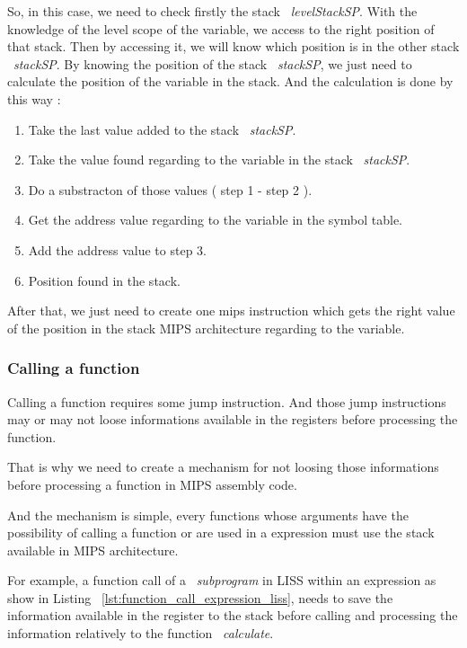 \documentclass[
  oneside,
  11pt, a4paper,
  footinclude=true,
  headinclude=true,
  cleardoublepage=empty
]{scrbook}
\begin{document}
So, in this case, we need to check firstly the stack ~\textit{levelStackSP}. With the knowledge of the level scope of the variable, we access to the right position of that stack. Then by accessing it, we will know which position is in the other stack ~\textit{stackSP}.
By knowing the position of the stack ~\textit{stackSP}, we just need to calculate the position of the variable in the stack.
And the calculation is done by this way :

\begin{enumerate}
\item Take the last value added to the stack ~\textit{stackSP}.
\item Take the value found regarding to the variable in the stack ~\textit{stackSP}.
\item Do a substracton of those values ( step 1 - step 2 ).
\item Get the address value regarding to the variable in the symbol table.
\item Add the address value to step 3.
\item Position found in the stack.
\end{enumerate}

After that, we just need to create one mips instruction which gets the right value of the position in the stack MIPS architecture regarding to the variable.

\subsubsection{Calling a function}

Calling a function requires some jump instruction. And those jump instructions may or may not loose informations available in the registers before processing the function.

That is why we need to create a mechanism for not loosing those informations before processing a function in MIPS assembly code.

And the mechanism is simple, every functions whose arguments have the possibility of calling a function or are used in a expression must use the stack available in MIPS architecture.

For example, a function call of a ~\textit{subprogram} in LISS within an expression as show in Listing ~\ref{lst:function_call_expression_liss}, needs to save the information available in the register to the stack before calling and processing the information relatively to the function ~\textit{calculate}.
\end{document}
